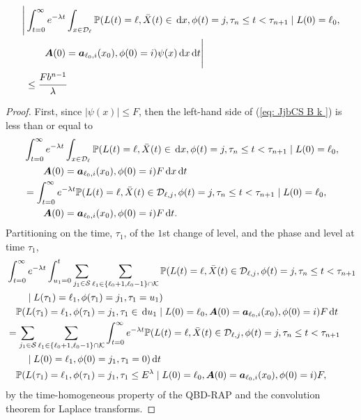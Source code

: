 \begin{cor}\label{vcor: cdks d}
	\begin{align}
		\Bigg|&\int_{t=0}^\infty e^{-\lambda t}\int_{x\in\mathcal{D}_\ell}\mathbb P(L(t) = \ell, \bar X(t)\in\, \mathrm{d} x, \phi(t) = j, \tau_{n}\leq t<\tau_{n+1} \mid L(0)=\ell_0,  \nonumber 
		\\&\qquad \boldsymbol A(0)=\boldsymbol a_{\ell_0,i}(x_0), \phi(0)=i)\psi(x)\, \mathrm{d} x\, \mathrm{d} t \Bigg|\nonumber
		\\&\leq \cfrac{F b^{n-1}}{\lambda}\label{eq: JjbCS  B k }
	\end{align}
\end{cor}
\begin{proof}
	First, since \(|\psi(x)|\leq F\), then the left-hand side of (\ref{eq: JjbCS  B k }) is less than or equal to 
	\begin{align}
		&\int_{t=0}^\infty e^{-\lambda t}\int_{x\in\mathcal{D}_\ell}\mathbb P(L(t) = \ell, \bar X(t)\in\, \mathrm{d} x, \phi(t) = j, \tau_{n}\leq t<\tau_{n+1} \mid L(0)=\ell_0,  \nonumber 
		\\&\qquad \boldsymbol A(0)=\boldsymbol a_{\ell_0,i}(x_0), \phi(0)=i)F\, \mathrm{d} x\, \mathrm{d} t \nonumber
		\\&=\int_{t=0}^\infty e^{-\lambda t} \mathbb P(L(t) = \ell, \bar X(t)\in\mathcal D_{\ell,j}, \phi(t) = j, \tau_{n}\leq t<\tau_{n+1} \mid L(0)=\ell_0,  \nonumber 
		\\&\qquad{} \boldsymbol A(0)=\boldsymbol a_{\ell_0,i}(x_0), \phi(0)=i)F\, \mathrm{d} t. \nonumber
	\end{align}
	Partitioning on the time, \(\tau_1\), of the \(1\)st change of level, and the phase and level at time \(\tau_1\), 
	\begin{align}
		&\int_{t=0}^\infty e^{-\lambda t} \int_{u_1=0}^t \sum_{j_1\in\mathcal S}\sum_{\ell_1\in\{\ell_0+1,\ell_0-1\}\cap\mathcal K}\mathbb P(L(t) = \ell, \bar X(t)\in\mathcal D_{\ell,j}, \phi(t) = j, \tau_{n}\leq t<\tau_{n+1} \nonumber
		\\&\qquad{}\mid L(\tau_1)=\ell_1,\phi(\tau_1)=j_1, \tau_1=u_1)\nonumber
		\\&\quad\mathbb P(L(\tau_1)=\ell_1,\phi(\tau_1)=j_1, \tau_1\in \, \mathrm{d} u_1
		\mid L(0)=\ell_0,   
		\boldsymbol A(0)=\boldsymbol a_{\ell_0,i}(x_0), \phi(0)=i)F  \, \mathrm{d} t\nonumber
		\\&= \sum_{j_1\in\mathcal S}\sum_{\ell_1\in\{\ell_0+1,\ell_0-1\}\cap\mathcal K} \int_{t=0}^\infty e^{-\lambda t} \mathbb P(L(t) = \ell, \bar X(t)\in\mathcal D_{\ell,j}, \phi(t) = j, \tau_{n}\leq t<\tau_{n+1} \nonumber
		\\&\qquad{}\mid L(0)=\ell_1,\phi(0)=j_1, \tau_1=0) \, \mathrm{d} t \nonumber
		\\&\quad\mathbb P(L(\tau_1)=\ell_1,\phi(\tau_1)=j_1, \tau_1\leq E^\lambda
		\mid L(0)=\ell_0,   
		\boldsymbol A(0)=\boldsymbol a_{\ell_0,i}(x_0), \phi(0)=i)F, \label{eqn fLks}
	\end{align}
	by the time-homogeneous property of the QBD-RAP and the convolution theorem for Laplace transforms. 
	

\end{proof}
